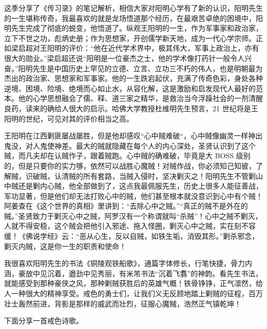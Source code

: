 这季分享了《传习录》的笔记解析，相信大家对阳明心学有了新的认识，阳明先生的一生堪称传奇，我最喜欢的就是龙场悟道那个经历，在最艰苦卓绝的困境中，阳明先生完成了彻底的蜕变，他悟道了。纵观王阳明的一生，作为军事家和政治家，立下不世之功，彪炳史册；作为思想家，开创儒学新天地，成为一代心学宗师。正如梁启超对王阳明的评价：“他在近代学术界中，极其伟大，军事上政治上，亦有很大的勋业。”梁启超还说“阳明是一位豪杰之士，他的学术像打药针一般令人兴奋。”阳明先生是中国历史上罕见的立德、立言、立功三不朽的伟人，也是明朝最为杰出的政治家、思想家和军事家。他的一生跌宕起伏，充满了传奇色彩，身处各种逆境、困境、险境、绝境而心如止水，从容化解，这是激励和启发现代人最好的范本。他的心学思想融会了儒、释、道三家之精华，是救治当今浮躁社会的一剂清醒良药，读来的确给人很大的启示。哈佛大学教授杜维明先生预言，21 世纪将是王阳明的世纪，可见对其的评价相当之高。

王阳明在江西剿匪屡战屡胜，但是他却感叹“心中贼难破“，心中贼像幽灵一样神出鬼没，对人鬼使神差。最大的贼就隐藏在每个人的内心深处，圣贤认识到了这个贼，而凡夫却在认贼作子，跟着贼跑。心中贼的确难破，毕竟是大 BOSS 级别的，但是只要你的实力够，依然可以战胜心魔贼！对贼作战，你必须知己知彼，了解贼，识破贼，认清贼的所有套路，当贼入侵时，坚决剿灭之！阳明先生不管剿山中贼还是剿内心贼，他全部做到了，这点我最佩服先生，历史上很多人能征善战，军功显著，但是他们却无法打败心中的贼，他们甚至根本就没意识到心中有个贼！阿姜查在《这个世界的真相》里讲到：“去除心中之贼。”“真正的贼不是外在的贼。”圣贤致力于剿灭心中之贼，阿罗汉有一个称谓就叫“杀贼”！心中之贼不剿灭，人就不得安稳，这个贼会把他引入邪途、拖入怪圈，剿灭心中之贼，实在刻不容缓！《佛说孛经》云：“恶从心生，反以自贼，如铁生垢，消毁其形。”剿杀邪念，剿灭内贼，这是你一生的职责和使命！

我很喜欢阳明先生的书法《铜陵观铁船歌》，通篇字体修长，行笔快捷，骨力内涵，豪放中见沉着，遒劲中见秀丽，有米芾书法“沉着飞翥”的神韵。看先生书法，就能感受到那种豪侠之风，那种剿贼获胜后的英雄气概！铁骨铮铮，正气凛然，给人一种很大的精神享受。戒色的勇士们，让我们义无反顾地踏上剿贼的征程，百万壮士轰然前进，背影是那样的威武而壮烈，征服心魔贼，浩然正气镇乾坤！

下面分享一首戒色诗歌。

